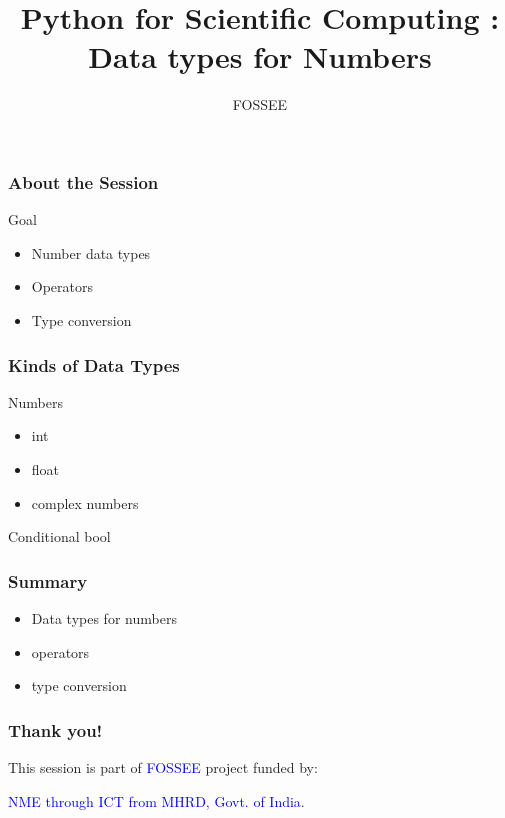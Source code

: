 \documentclass[14pt,compress]{beamer}
\title{Python for Scientific Computing : Data types for Numbers}
\author[FOSSEE] {FOSSEE}
\institute[IIT Bombay] {Department of Aerospace Engineering\\IIT Bombay}
\date{}
\begin{document}
\begin{frame}
  \maketitle
\end{frame}

\begin{frame}
  \frametitle{About the Session}
  \begin{block}{Goal}
    \begin{itemize}
    \item Number data types
    \item Operators
    \item Type conversion    
    \end{itemize}  
  \end{block}
\end{frame}

\begin{frame}
  \frametitle{Kinds of Data Types}
  \begin{block}{Numbers}
    \begin{itemize}
    \item int
    \item float
    \item complex numbers
    \end{itemize}    
  \end{block}
  \begin{block}{Conditional}
    bool
  \end{block}
\end{frame}

\begin{frame}[fragile]
  \frametitle{Summary}
  \begin{block}{}
    \begin{itemize}
    \item Data types for numbers
    \item operators
    \item type conversion
    \end{itemize}
  \end{block}    
\end{frame}

\begin{frame}
  \frametitle{Thank you!}  
  \begin{block}{}
  This session is part of \textcolor{blue}{FOSSEE} project funded by:
  \begin{center}
    \textcolor{blue}{NME through ICT from MHRD, Govt. of India}.
  \end{center}  
  \end{block}
\end{frame}
\end{document}
